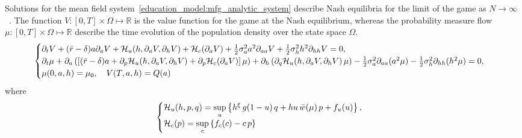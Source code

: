 Solutions for the mean field system~\eqref{education_model:mfg_analytic_system} describe Nash equilibria for the limit of the game as $N \to \infty$~\cite{cardaliaguet2010notes}.
The function $V: [0,T] \times \Omega \mapsto \mathbb{R}$ is the value function for the game at the Nash equilibrium,
whereas the probability measure flow $\mu: [0,T] \times \Omega \mapsto \mathbb{R}$ describe the time evolution of the  population density over the state space $\Omega$.
\begin{equation}\label{education_model:mfg_analytic_system}
    \begin{cases}
        \partial_t V + (\bar r  - \delta) a \partial_a V + \mathcal{H}_u(h, \partial_a V, \partial_h V)  + \mathcal{H}_c(\partial_a V) + \frac{1}{2} \sigma_a^2 a^2 \partial_{aa} V + \frac{1}{2} \sigma^2_h h^2 \partial_{hh} V = 0,\\
        \partial_t \mu + \partial_a \left( \left[ (\bar r - \delta) a + \partial_p \mathcal{H}_u(h, \partial_a V, \partial_h V) + \partial_p \mathcal{H}_c(\partial_a V) \right] \mu \right)  + \partial_h \left( \partial_q \mathcal{H}_u(h, \partial_a V, \partial_h V)\, \mu\right)  - \frac{1}{2} \sigma_a^2 \partial_{aa} (a^2\mu) - \frac{1}{2} \sigma^2_h \partial_{hh} (h^2\mu) = 0,\\
        \mu(0,a,h) = \mu_0,\quad V(T,a,h) = Q(a)
    \end{cases}
\end{equation}
where
\begin{equation}
    \begin{cases}
        \mathcal{H}_u(h,p,q) = \sup\limits_{u} \left \{ h^\xi \, g(1 - u)\, q + h u \, \bar w (\mu)\, p + f_u(u)\right\},\\
        \mathcal{H}_c(p) = \sup\limits_{c} \left \{  f_c(c) - c \, p \right \}
    \end{cases}
\end{equation}

